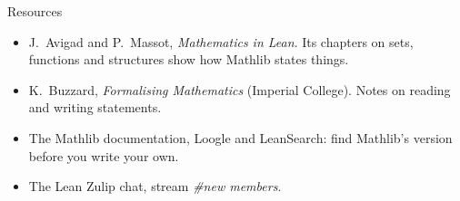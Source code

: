 \documentclass[10pt, aspectratio=169]{beamer}
\begin{document}
\begin{frame}[fragile]{Resources}
\begin{itemize}
\item J.\ Avigad and P.\ Massot, \emph{Mathematics in Lean}. Its chapters on sets, functions and structures show how Mathlib states things.
\item K.\ Buzzard, \emph{Formalising Mathematics} (Imperial College). Notes on reading and writing statements.
\item The Mathlib documentation, Loogle and LeanSearch: find Mathlib's version before you write your own.
\item The Lean Zulip chat, stream \emph{\#new members}.
\end{itemize}
\end{frame}
\end{document}
